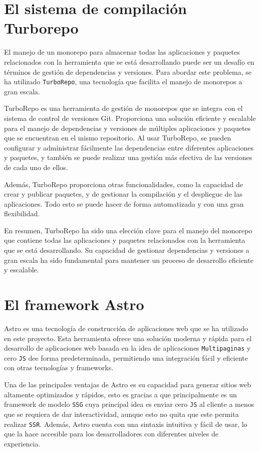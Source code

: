 \section{El sistema de compilación Turborepo}
El manejo de un monorepo para almacenar todas las aplicaciones y paquetes relacionados con la herramienta que se está desarrollando puede ser un desafío en términos de gestión de dependencias y versiones. Para abordar este problema, se ha utilizado \verb|TurboRepo|\cite{turborepo}, una tecnología que facilita el manejo de monorepos a gran escala.

TurboRepo es una herramienta de gestión de monorepos que se integra con el sistema de control de versiones Git. Proporciona una solución eficiente y escalable para el manejo de dependencias y versiones de múltiples aplicaciones y paquetes que se encuentran en el mismo repositorio. Al usar TurboRepo, se pueden configurar y administrar fácilmente las dependencias entre diferentes aplicaciones y paquetes, y también se puede realizar una gestión más efectiva de las versiones de cada uno de ellos.

Además, TurboRepo proporciona otras funcionalidades, como la capacidad de crear y publicar paquetes, y de gestionar la compilación y el despliegue de las aplicaciones. Todo esto se puede hacer de forma automatizada y con una gran flexibilidad.

En resumen, TurboRepo ha sido una elección clave para el manejo del monorepo que contiene todas las aplicaciones y paquetes relacionados con la herramienta que se está desarrollando. Su capacidad de gestionar dependencias y versiones a gran escala ha sido fundamental para mantener un proceso de desarrollo eficiente y escalable.

\section{El framework Astro}
Astro es una tecnología de construcción de aplicaciones web que se ha utilizado en este proyecto. Esta herramienta ofrece una solución moderna y rápida para el desarrollo de aplicaciones web basada en la idea de aplicaciones \verb|Multipaginas|\cite{multipage} y cero \verb|JS|\cite{js} dee forma predeterminada, permitiendo una integración fácil y eficiente con otras tecnologías y frameworks.

Una de las principales ventajas de Astro es su capacidad para generar sitios web altamente optimizados y rápidos, esto es gracias a que principalmente es un framework de modelo \verb|SSG|\cite{ssg} cuya principal idea es enviar cero \verb|JS|\cite{js} al cliente a menos que se requiera de dar interactividad, aunque esto no quita que este permita realizar \verb|SSR|\cite{ssr}. Además, Astro cuenta con una sintaxis intuitiva y fácil de usar, lo que la hace accesible para los desarrolladores con diferentes niveles de experiencia.

